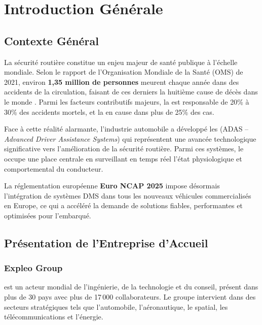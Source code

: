 
\chapter{Introduction Générale}

\section{Contexte Général}

La sécurité routière constitue un enjeu majeur de santé publique à l'échelle mondiale. Selon le rapport de l'Organisation Mondiale de la Santé (OMS) de 2021, environ \textbf{1,35 million de personnes} meurent chaque année dans des accidents de la circulation, faisant de ces derniers la huitième cause de décès dans le monde \cite{oms2021}. Parmi les facteurs contributifs majeurs, la  est responsable de 20\% à 30\% des accidents mortels, et la  en cause dans plus de 25\% des cas.

Face à cette réalité alarmante, l'industrie automobile a développé les  (ADAS -- \textit{Advanced Driver Assistance Systems}) qui représentent une avancée technologique significative vers l'amélioration de la sécurité routière. Parmi ces systèmes, le  occupe une place centrale en surveillant en temps réel l'état physiologique et comportemental du conducteur.

La réglementation européenne \textbf{Euro NCAP 2025} \cite{euroncap2023} impose désormais l'intégration de systèmes DMS dans tous les nouveaux véhicules commercialisés en Europe, ce qui a accéléré la demande de solutions fiables, performantes et optimisées pour l'embarqué.

\section{Présentation de l'Entreprise d'Accueil}

\subsection{Expleo Group}

 est un acteur mondial de l'ingénierie, de la technologie et du conseil, présent dans plus de 30 pays avec plus de 17\,000 collaborateurs. Le groupe intervient dans des secteurs stratégiques tels que l'automobile, l'aéronautique, le spatial, les télécommunications et l'énergie.

